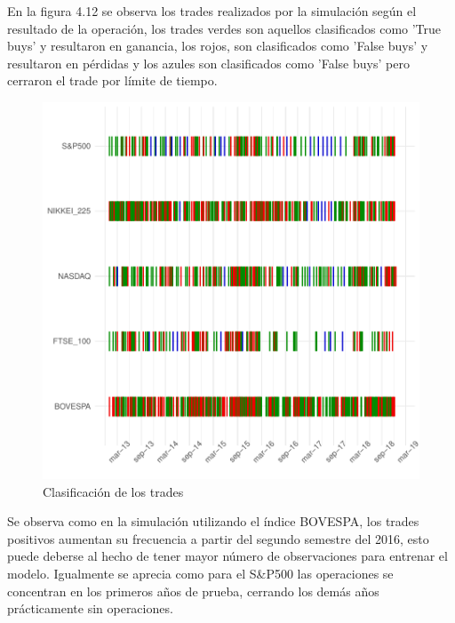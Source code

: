 \documentclass[a4paper,12pt]{Latex/Classes/PhDthesisPSnPDF}
\begin{document}
En la figura 4.12 se observa los trades realizados por la simulación según el resultado de la operación, los trades verdes son aquellos clasificados como 'True buys' y resultaron en ganancia, los rojos, son clasificados como 'False buys' y resultaron en pérdidas y los azules son clasificados como 'False buys' pero cerraron el trade por límite de tiempo.

\begin{figure}[H]
\centering
\includegraphics{main-031}
\caption{Clasificación de los trades}
\end{figure}

Se observa como en la simulación utilizando el índice BOVESPA, los trades positivos aumentan su frecuencia a partir del segundo semestre del 2016, esto puede deberse al hecho de tener mayor número de observaciones para entrenar el modelo. Igualmente se aprecia como para el S\&P500 las operaciones se concentran en los primeros años de prueba, cerrando los demás años prácticamente sin operaciones.
\end{document}
